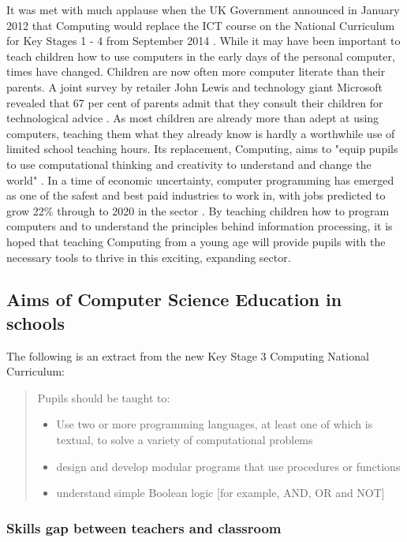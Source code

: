 \documentclass[ %
                    author={Jonathan Rankin},
                supervisor={Dr. David May, Dr. Ian Holyer},
                    degree={MEng},
                     title={CodeTouch},
                  subtitle={A Revolutionary Way To Program Real Code On Touch Screen Devices},
                      type={enterprise},
                      year={2015 } ]{dissertation}
\begin{document}
It was met with much applause when the UK Government announced in January 2012 that Computing would replace the ICT course on the National Curriculum for Key Stages 1 - 4 from September 2014 \cite{BBCITCstory}.  While it may have been important to teach children how to use computers in the early days of the personal computer, times have changed. Children are now often more computer literate than their parents. A joint survey by retailer John Lewis and technology giant Microsoft revealed that 67 per cent of parents admit that they consult their children for technological advice \cite{TwoThirds}. As most children are already more than adept at using computers, teaching them what they already know is hardly a worthwhile use of limited school teaching hours. Its replacement, Computing, aims to "equip pupils to use computational thinking and creativity to understand and change the world" \cite{ComputingCurric}. In a time of economic uncertainty, computer programming has emerged as one of the safest and best paid industries to work in, with jobs predicted to grow 22\% through to 2020 in the sector \cite{22percent}.  By teaching children how to program computers and to understand the principles behind information processing, it is hoped that teaching Computing from a young age will provide pupils with the necessary tools to thrive in this exciting, expanding sector. 

\subsection{Aims of Computer Science Education in schools}\label{ssec:KS3}
The following is an extract from the new Key Stage 3 Computing National Curriculum:

\begin{quote}
Pupils should be taught to:
\begin{itemize}
\item Use two or more programming languages, at least one of which is textual, to solve a
variety of computational problems
\item design and develop modular programs that use procedures or functions
\item understand simple Boolean logic [for example, AND, OR and NOT] 
\end{itemize}
\end{quote}



\subsubsection{Skills gap between teachers and classroom}
\end{document}

